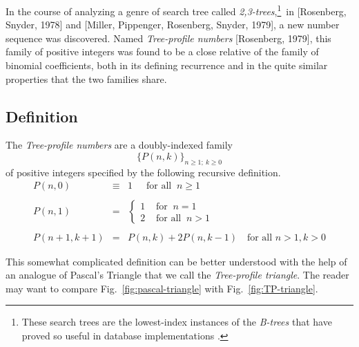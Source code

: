 

  

In the course of analyzing a genre of search tree called {\it 2,3-trees},\footnote{These search trees are the lowest-index instances of the {\it B-trees} that have proved so useful in database implementations \cite{CLRS}.}~in [Rosenberg, Snyder, 1978] and
[Miller, Pippenger, Rosenberg, Snyder, 1979], a new number sequence was discovered.  Named {\it Tree-profile numbers} [Rosenberg, 1979], this family of positive integers was found to be a close relative of the family of binomial coefficients, both in its defining recurrence and in the quite similar properties that the two families share.

\subsection{Definition}

The {\it Tree-profile numbers} are a doubly-indexed family
\[ \big\{ P(n,k) \big\}_{n \geq 1; \ k \geq 0}  \]
of positive integers specified by the following recursive definition.
\begin{equation}
\label{eq:TP-defn}
\begin{array}{ccl}
P(n,0) & \equiv & 1 \ \ \ \ \ \mbox{ for all } \ n \geq 1 \\
  & & \\
P(n,1) & = &
  {\displaystyle
\left\{
\begin{array}{cl}
 1 & \mbox{ for } \ n=1 \\
 2 & \mbox{ for all } \ n > 1
\end{array}
\right.  } \\
  & & \\
P(n+1, k+1) & = & P(n,k) + 2 P(n, k-1) \ \ \  \mbox{ for all } n > 1, k > 0
\end{array}
\end{equation}

This somewhat complicated definition can be better understood with the help of an analogue of Pascal's Triangle that we call the {\it Tree-profile triangle}.  The reader may want to compare
Fig.~\ref{fig:pascal-triangle} with Fig.~\ref{fig:TP-triangle}.

\smallskip

